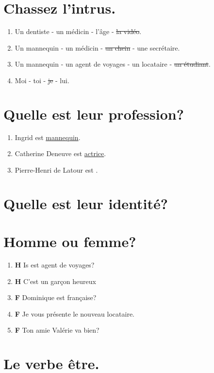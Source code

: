 \section{Chassez l'intrus.}

\begin{enumerate}
    \item Un dentiste - un médicin - l'âge - \sout{la vidéo}.
    \item Un mannequin - un médicin - \sout{un chein} - une secrétaire.
    \item Un mannequin - un agent de voyages - un locataire - \sout{un étudiant}.
    \item Moi - toi - \sout{je} - lui.
\end{enumerate}

\section{Quelle est leur profession?}

\begin{enumerate}
    \item Ingrid est \underline{mannequin}.
    \item Catherine Deneuve est \underline{actrice}.
    \item Pierre-Henri de Latour est \underline{}.
\end{enumerate}

\section{Quelle est leur identité?}

\section{Homme ou femme?}

\begin{enumerate}
    \item \textbf{H} \rar Is est agent de voyages?
    \item \textbf{H} \rar C'est un garçon heureux
    \item \textbf{F} \rar Dominique est française?
    \item \textbf{F} \rar Je vous présente le nouveau locataire.
    \item \textbf{F} \rar Ton amie Valérie va bien?
\end{enumerate}

\section{Le verbe être.}

